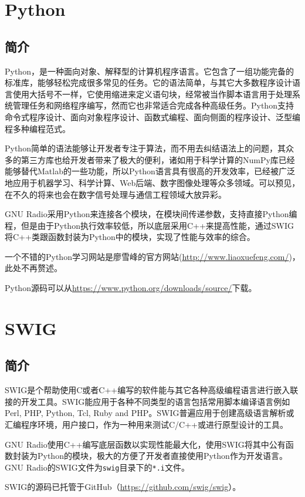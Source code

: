 	\section{Python}
		\subsection{简介}
			\par Python，是一种面向对象、解释型的计算机程序语言。它包含了一组功能完备的标准库，能够轻松完成很多常见的任务。它的语法简单，与其它大多数程序设计语言使用大括号不一样，它使用缩进来定义语句块，经常被当作脚本语言用于处理系统管理任务和网络程序编写，然而它也非常适合完成各种高级任务。Python支持命令式程序设计、面向对象程序设计、函数式编程、面向侧面的程序设计、泛型编程多种编程范式。
			\par Python简单的语法能够让开发者专注于算法，而不用去纠结语法上的问题，其众多的第三方库也给开发者带来了极大的便利，诸如用于科学计算的NumPy库已经能够替代Matlab的一些功能，所以Python语言具有很高的开发效率，已经被广泛地应用于机器学习、科学计算、Web后端、数字图像处理等众多领域。可以预见，在不久的将来也会在数字信号处理与通信工程领域大放异彩。
			\par GNU Radio采用Python来连接各个模块，在模块间传递参数，支持直接Python编程，但是由于Python执行效率较低，所以底层采用C++来提高性能，通过SWIG将C++类跟函数封装为Python中的模块，实现了性能与效率的综合。
			\par 一个不错的Python学习网站是廖雪峰的官方网站(\href{http://www.liaoxuefeng.com/}{http://www.liaoxuefeng.com/})，此处不再赘述。
			\par Python源码可以从\href{https://www.python.org/downloads/source/}{https://www.python.org/downloads/source/}下载。
	\section{SWIG}
		\subsection{简介}
			\par SWIG是个帮助使用C或者C++编写的软件能与其它各种高级编程语言进行嵌入联接的开发工具。SWIG能应用于各种不同类型的语言包括常用脚本编译语言例如Perl, PHP, Python, Tcl, Ruby and PHP。SWIG普遍应用于创建高级语言解析或汇编程序环境，用户接口，作为一种用来测试C/C++或进行原型设计的工具。
			\par GNU Radio使用C++编写底层函数以实现性能最大化，使用SWIG将其中公有函数封装为Python的模块，极大的方便了开发者直接使用Python作为开发语言。GNU Radio的SWIG文件为\lstinline[language=sh]{swig}目录下的\lstinline[language=sh]{*.i}文件。
			\par SWIG的源码已托管于GitHub（\href{https://github.com/swig/swig}{https://github.com/swig/swig}）。
